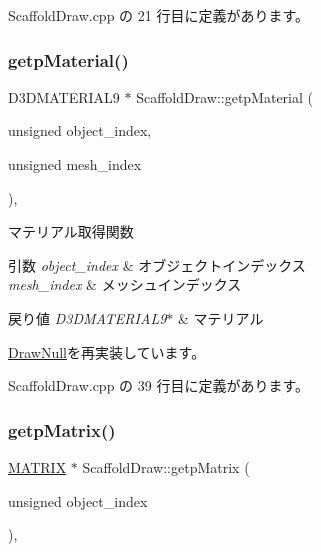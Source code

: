  Scaffold\+Draw.\+cpp の 21 行目に定義があります。

\mbox{\label{class_scaffold_draw_a22d8838f68a92b3307008ba952ad718d}} 
\subsubsection{\texorpdfstring{getp\+Material()}{getpMaterial()}}
{\footnotesize\ttfamily D3\+D\+M\+A\+T\+E\+R\+I\+A\+L9 $\ast$ Scaffold\+Draw\+::getp\+Material (\begin{DoxyParamCaption}\item[{unsigned}]{object\+\_\+index,  }\item[{unsigned}]{mesh\+\_\+index }\end{DoxyParamCaption})\hspace{0.3cm}{\ttfamily [override]}, {\ttfamily [virtual]}}



マテリアル取得関数 


\begin{DoxyParams}{引数}
{\em object\+\_\+index} & オブジェクトインデックス \\
\hline
{\em mesh\+\_\+index} & メッシュインデックス \\
\hline
\end{DoxyParams}

\begin{DoxyRetVals}{戻り値}
{\em D3\+D\+M\+A\+T\+E\+R\+I\+A\+L9$\ast$} & マテリアル \\
\hline
\end{DoxyRetVals}


\mbox{\hyperlink{class_draw_null_a0c1efe55fea325ad277594be6fe1e938}{Draw\+Null}}を再実装しています。



 Scaffold\+Draw.\+cpp の 39 行目に定義があります。

\mbox{\label{class_scaffold_draw_a337aafb07b51a215f7f25ab67202b102}} 
\subsubsection{\texorpdfstring{getp\+Matrix()}{getpMatrix()}}
{\footnotesize\ttfamily \mbox{\hyperlink{_matrix_8h_a032295cd9fb1b711757c90667278e744}{M\+A\+T\+R\+IX}} $\ast$ Scaffold\+Draw\+::getp\+Matrix (\begin{DoxyParamCaption}\item[{unsigned}]{object\+\_\+index }\end{DoxyParamCaption})\hspace{0.3cm}{\ttfamily [override]}, {\ttfamily [virtual]}}



